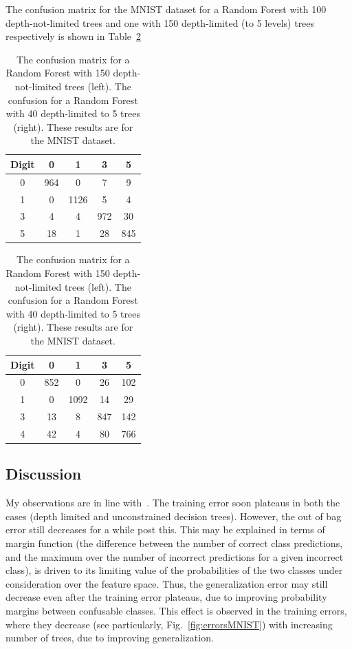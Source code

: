 \documentclass[5pt]{article}
\begin{document}
The confusion matrix for the MNIST dataset for a Random Forest with 100
depth-not-limited trees and one with 150 depth-limited (to 5 levels) trees
respectively is shown
in Table~\ref{tab:confusionMNIST}
\begin{table}
\centering
\begin{tabular}{ccccc}
\toprule
Digit & 0 & 1 & 3 & 5 \\
\midrule
0 & 964 & 0 & 7 & 9\\
1 & 0 & 1126 & 5 & 4\\
3 & 4 & 4 & 972 & 30\\
5 & 18 & 1 & 28 & 845\\
\bottomrule
\end{tabular}
\quad
\begin{tabular}{ccccc}
\toprule
Digit & 0 & 1 & 3 & 5\\
\midrule
0 & 852 & 0 & 26 & 102\\
1 & 0  & 1092 &  14 & 29\\
3 & 13 & 8 & 847 & 142\\
4 & 42 & 4 & 80 & 766\\
\bottomrule
\end{tabular}
\caption{The confusion matrix for a Random Forest with 150 depth-not-limited
  trees (left). The confusion for a Random Forest with 40 depth-limited to 5
trees (right). These results are for the MNIST dataset.}
\label{tab:confusionMNIST}
\end{table}

\subsection{Discussion}
My observations are in line with~\cite{breiman2001random}. The training error
soon plateaus in both the cases (depth limited and unconstrained decision
trees). However, the out of bag error still decreases for a while post this.
This may be explained in terms of margin function (the difference between the
number of correct class predictions, and the maximum over the number of incorrect
predictions for a given incorrect class), is driven to its limiting value of the
probabilities of the two classes under consideration over the feature space.
Thus, the generalization error may still decrease even after the training error
plateaus, due to improving probability margins between confusable classes. This
effect is observed in the training errors, where they decrease (see
particularly, Fig.~\ref{fig:errorsMNIST}) with increasing number of trees, due
to improving generalization.
\end{document}
